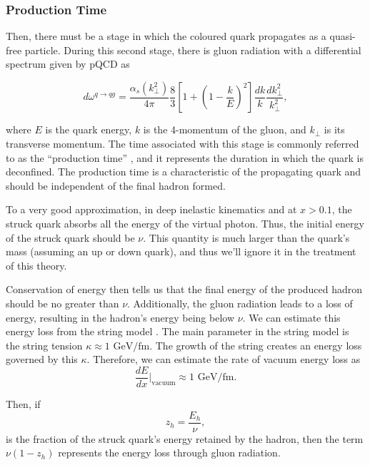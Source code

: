 \subsubsection{Production Time}
\label{10.32::production_time}
    Then, there must be a stage in which the coloured quark propagates as a quasi-free particle.
    During this second stage, there is gluon radiation with a differential spectrum given by pQCD as

    \begin{equation*}
        d\omega^{q \rightarrow qg} =
            \frac{\alpha_s(k_\perp^2)}{4\pi}
            \frac{8}{3}\left[ 1 + \left( 1 - \frac{k}{E} \right)^2 \right]
            \frac{dk}{k} \frac{dk_\perp^2}{k_\perp^2},
    \end{equation*}

    where $E$ is the quark energy, $k$ is the 4-momentum of the gluon, and $k_\perp$ is its transverse momentum.
    The time associated with this stage is commonly referred to as the ``production time'' \cite{kopeliovich2004}, and it represents the duration in which the quark is deconfined.
    The production time is a characteristic of the propagating quark and should be independent of the final hadron formed.

    To a very good approximation, in deep inelastic kinematics and at $x > 0.1$, the struck quark absorbs all the energy of the virtual photon.
    Thus, the initial energy of the struck quark should be $\nu$.
    This quantity is much larger than the quark's mass (assuming an up or down quark), and thus we'll ignore it in the treatment of this theory.

    Conservation of energy then tells us that the final energy of the produced hadron should be no greater than $\nu$.
    Additionally, the gluon radiation leads to a loss of energy, resulting in the hadron's energy being below $\nu$.
    We can estimate this energy loss from the string model \cite{artru1974}.
    The main parameter in the string model is the string tension $\kappa \approx 1 \text{ GeV}/\text{fm}$.
    The growth of the string creates an energy loss governed by this $\kappa$.
    Therefore, we can estimate the rate of vacuum energy loss as
    \begin{equation*}
        \frac{dE}{dx}\Big|_\text{vacuum} \approx 1 \text{ GeV}/\text{fm}.
    \end{equation*}

    Then, if
    \begin{equation}
        z_h = \frac{E_h}{\nu},
        \label{eq::10.32::zh}
    \end{equation}
    is the fraction of the struck quark's energy retained by the hadron, then the term $\nu(1 - z_h)$ represents the energy loss through gluon radiation.

